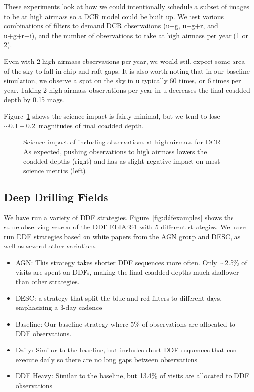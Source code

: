 These experiments look at how we could intentionally schedule a subset of images to be at high airmass so a DCR model could be built up. We test various combinations of filters to demand DCR observations (u+g, u+g+r, and u+g+r+i), and the number of observations to take at high airmass per year (1 or 2). 

Even with 2 high airmass observations per year, we would still expect some area of the sky to fall in chip and raft gaps.  It is also worth noting that in our baseline simulation, we observe a spot on the sky in u typically 60 times, or 6 times per year. Taking 2 high airmass observations per year in u decreases the final coadded depth by 0.15 mags.

Figure~\ref{fig:dcr_radar} shows the science impact is fairly minimal, but we tend to lose $\sim0.1-0.2$\ magnitudes of final coadded depth.

\begin{figure}
\caption{Science impact of including observations at high airmass for DCR. As expected, pushing observations to high airmass lowers the coadded depths (right) and has as slight negative impact on most science metrics (left).}\label{fig:dcr_radar}
\end{figure}
   
\subsection{Deep Drilling Fields}

We have run a variety of DDF strategies. Figure~\ref{fig:ddfexamples} shows the same observing season of the DDF ELIASS1 with 5 different strategies. We have run DDF strategies based on white papers from the AGN group and DESC, as well as several other variations. 

\begin{itemize}
    \item{AGN: This strategy takes shorter DDF sequences more often. Only $\sim$2.5\% of visits are spent on DDFs, making the final coadded depths much shallower than other strategies.}
    \item{DESC: a strategy that split the blue and red filters to different days, emphasizing a 3-day cadence}
    \item{Baseline:  Our baseline strategy where 5\% of observations are allocated to DDF observations.}
    \item{Daily: Similar to the baseline, but includes short DDF sequences that can execute daily so there are no long gaps between observations}
    \item{DDF Heavy:  Similar to the baseline, but 13.4\% of visits are allocated to DDF observations}
\end{itemize}


